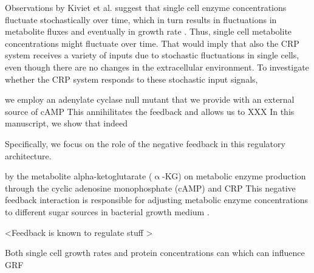 %
Observations by Kiviet et al. suggest that single cell enzyme concentrations fluctuate stochastically over time, which in turn results in fluctuations in metabolite fluxes and eventually in growth rate \cite{Kiviet2014}.
%
Thus, single cell metabolite concentrations might fluctuate over time.
That would imply that also the CRP system receives a variety of inputs due to stochastic fluctuations in single cells, even though there are no changes in the extracellular environment.
%
To investigate whether the CRP system responds to these stochastic input signals, 
%

%
we employ an adenylate cyclase null mutant that we provide with an external source of cAMP
This annihilitates the feedback and allows us to XXX
%
In this manuscript, we show that indeed 

 


Specifically, we focus on the role of the negative feedback in this regulatory architecture.


by the metabolite alpha-ketoglutarate ($\upalpha$-KG) on metabolic enzyme production through the cyclic adenosine monophosphate (cAMP) and CRP 
This negative feedback interaction is responsible for adjusting metabolic enzyme concentrations to different sugar sources in bacterial growth medium \cite{Towbin2017, Doucette2011, You2013}.







<Feedback is known to regulate stuff \cite{Goyal2010}>

Both single cell growth rates and protein concentrations can 
which can influence GRF

